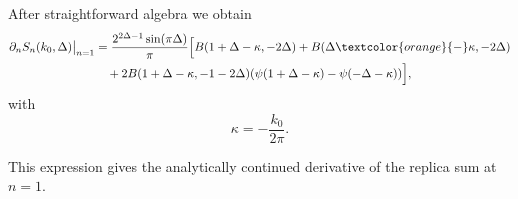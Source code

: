 \documentclass[11pt]{article}
\newcommand{\JM}[1]{\textcolor{orange}{#1}}
\begin{document}
After straightforward algebra we obtain
\begin{equation}
\begin{aligned}
\partial_n S_n(k_0,\Delta)\big|_{n=1}
&=
\frac{2^{2\Delta-1}\sin(\pi\Delta)}{\pi}
\Big[
B(1+\Delta-\kappa,-2\Delta)
+
B(\Delta\JM{-}\kappa,-2\Delta)
\\
&\quad
+ 2
B(1+\Delta-\kappa,-1-2\Delta)
(\psi(1+\Delta-\kappa)-\psi(-\Delta-\kappa))\Big],
\end{aligned}
\end{equation}
with
\begin{equation}
\kappa=-\frac{k_0}{2\pi}.
\end{equation}

This expression gives the analytically continued derivative of the replica
sum at $n=1$.
\end{document}
